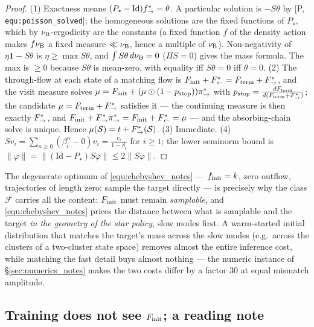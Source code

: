 \documentclass[11pt]{article}
\theoremstyle{definition}
\theoremstyle{remark}
\newcommand{\paperref}[1]{[P,\,\texttt{#1}]}   %
\begin{document}
\begin{proof}
(1) Exactness means $(P_\star-\mathrm{Id})f^*_{\rightarrow}=\theta$. A particular solution is
$-S\theta$ by \paperref{equ:poisson\_solved}; the homogeneous solutions are the fixed
functions of $P_\star$, which by $\nu_{\mathrm{B}}$-ergodicity are the constants (a fixed function
$f$ of the density action makes $f\nu_{\mathrm{B}}$ a fixed measure $\ll\nu_{\mathrm{B}}$, hence a multiple
of $\nu_{\mathrm{B}}$). Non-negativity of $\eta\mathbf 1-S\theta$ is $\eta\geq\max S\theta$, and
$\int S\theta\,d\nu_{\mathrm{B}}=0$ ($\Pi S=0$) gives the mass formula. The max is $\geq0$ because
$S\theta$ is mean-zero, with equality iff $S\theta=0$ iff $\theta=0$.
(2) The through-flow at each state of a matching flow is
$F_{\mathrm{init}}+F^*_{\leftarrow}=F_{\mathrm{term}}+F^*_{\rightarrow}$, and the visit measure solves
$\mu=F_{\mathrm{init}}+(\mu\odot(1-p_{\mathrm{stop}}))\pi_{\rightarrow}^*$ with
$p_{\mathrm{stop}}=\frac{dF_{\mathrm{term}}}{d(F_{\mathrm{term}}+F^*_{\rightarrow})}$; the candidate
$\mu=F_{\mathrm{term}}+F^*_{\rightarrow}$ satisfies it --- the continuing measure is then exactly
$F^*_{\rightarrow}$, and $F_{\mathrm{init}}+F^*_{\rightarrow}\pi_{\rightarrow}^*=F_{\mathrm{init}}+F^*_{\leftarrow}=\mu$ --- and the
absorbing-chain solve is unique. Hence $\mu(\mathcal S)=t+F^*_{\rightarrow}(\mathcal S)$.
(3) Immediate. (4) $Sv_i=\sum_{n\geq0}(\beta_i^n-0)v_i=\frac{v_i}{1-\beta_i}$ for
$i\geq1$; the lower seminorm bound is $\|\varphi\|=\|(\mathrm{Id}-P_\star)S\varphi\|\leq
2\|S\varphi\|$.
\end{proof}

The degenerate optimum of \eqref{equ:chebyshev_notes} --- $f_{\mathrm{init}}=k$, zero outflow, trajectories
of length zero: sample the target directly --- is precisely why the class $\mathcal F$
carries all the content: $F_{\mathrm{init}}$ must remain \emph{samplable}, and
\eqref{equ:chebyshev_notes} prices the distance between what is samplable and the target
\emph{in the geometry of the star policy}, slow modes first. A warm-started initial
distribution that matches the target's mass across the slow modes (e.g.\ across the
clusters of a two-cluster state space) removes almost the entire inference cost, while
matching the fast detail buys almost nothing --- the numeric instance of
\S\ref{sec:numerics_notes} makes the two costs differ by a factor $30$ at equal mismatch
amplitude.

\subsection{Training does not see $F_{\mathrm{init}}$; a reading note}\label{sec:training_remark_notes}
\end{document}
